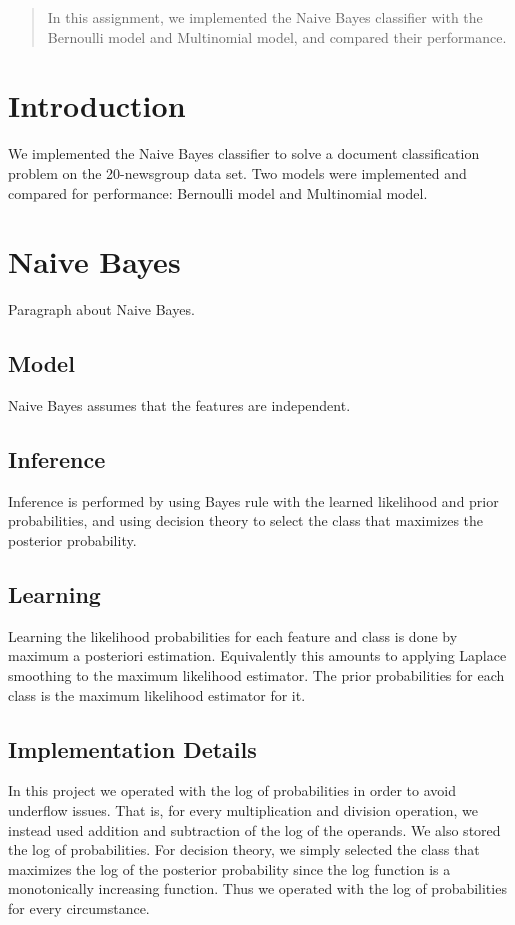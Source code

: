 \documentclass[12pt]{article}
\begin{document}
\maketitle

\begin{abstract}
In this assignment, we implemented the Naive Bayes classifier with the Bernoulli model and Multinomial model, and compared their performance.
\end{abstract}

\section{Introduction}
We implemented the Naive Bayes classifier to solve a document classification problem on the 20-newsgroup data set. Two models were implemented and compared for performance: Bernoulli model and Multinomial model.

\section{Naive Bayes}
Paragraph about Naive Bayes.

\subsection{Model}
Naive Bayes assumes that the features are independent.

\subsection{Inference}
Inference is performed by using Bayes rule with the learned likelihood and prior probabilities, and using decision theory to select the class that maximizes the posterior probability.

\subsection{Learning}
Learning the likelihood probabilities for each feature and class is done by maximum a posteriori estimation. Equivalently this amounts to applying Laplace smoothing to the maximum likelihood estimator. The prior probabilities for each class is the maximum likelihood estimator for it.

\subsection{Implementation Details}
In this project we operated with the log of probabilities in order to avoid underflow issues. That is, for every multiplication and division operation, we instead used addition and subtraction of the log of the operands. We also stored the log of probabilities. For decision theory, we simply selected the class that maximizes the log of the posterior probability since the log function is a monotonically increasing function. Thus we operated with the log of probabilities for every circumstance.
\end{document}

